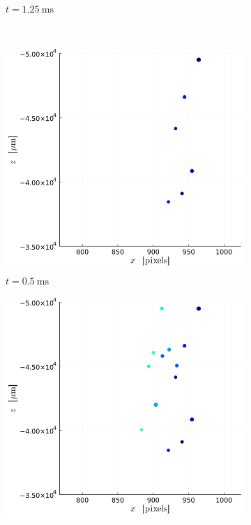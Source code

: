\begin{figure}[H]
\begin{subfigure}[t]{0.32\linewidth}
        \caption*{$t = \SI{1.25}{\ms}$}
    \end{subfigure}
    \\
    \begin{subfigure}[t]{0.32\linewidth}
        \includegraphics[width=\linewidth]{./Figure/4_Results/exp/xz_detailed_view/out0003.png}
        \caption*{$t = \SI{0.5}{\ms}$}
    \end{subfigure}
    \begin{subfigure}[t]{0.32\linewidth}
        \includegraphics[width=\linewidth]{./Figure/4_Results/exp/xz_detailed_view/out0007.png}

\end{subfigure}
\end{figure}
